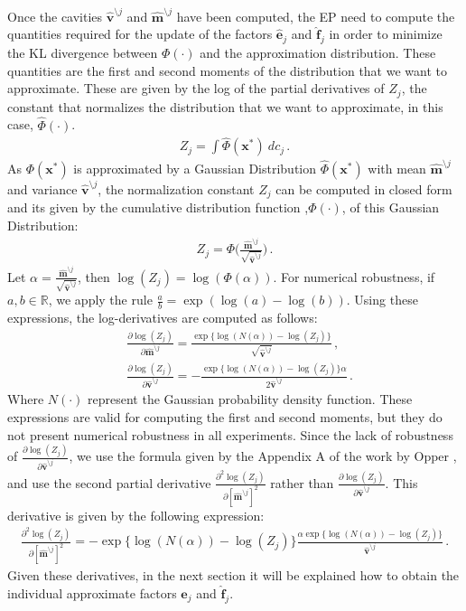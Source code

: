 \documentclass[review,preprint,12pt]{elsarticle}
\begin{document}
Once the cavities $\boldsymbol{\hat{v}}^{\setminus j}$ and $\boldsymbol{\hat{m}}^{\setminus j}$ have been computed, the EP need to compute the quantities required for the update of the factors $\boldsymbol{\hat{e}}_{j}$ and $\boldsymbol{\hat{f}}_{j}$ in order to minimize the KL divergence between $\Phi(\cdot)$ and the approximation distribution. These quantities are the first and second moments of the distribution that we want to approximate. These are given by the log of the partial derivatives of $Z_j$, the constant that normalizes the distribution that we want to approximate, in this case, $\hat{\Phi}(\cdot)$.
\begin{align}
Z_j = \int \hat{\Phi}(\boldsymbol{x}^*)\ dc_j\,.
\end{align}
As $\Phi(\boldsymbol{x}^*)$ is approximated by a Gaussian Distribution $\hat{\Phi}(\boldsymbol{x}^*)$ with mean $\boldsymbol{\hat{m}}^{\setminus j}$ and variance $\boldsymbol{\hat{v}}^{\setminus j}$, the normalization constant $Z_j$ can be computed in closed form and its given by the cumulative distribution function ,$\Phi(\cdot)$, of this Gaussian Distribution:
\begin{align}
Z_j = \Phi\Bigg(\frac{\boldsymbol{\hat{m}}^{\setminus j}}{\sqrt{\boldsymbol{\hat{v}}^{\setminus j}}}\Bigg)\,.
\end{align}
Let $\alpha =  \frac{\boldsymbol{\hat{m}}^{\setminus j}}{\sqrt{\boldsymbol{\hat{v}}^{\setminus j}}}$, then $\log(Z_j) = \log(\Phi(\alpha))$. For numerical robustness, if $a,b \in \mathbb{R}$, we apply the rule $ \frac{a}{b} = \exp{(\log(a)-\log(b))}$. Using these expressions, the log-derivatives are computed as follows:
\begin{align}
& \frac{\partial \log(Z_j)}{\partial \boldsymbol{\hat{m}}^{\setminus j}} = \frac{\exp\{\log(N(\alpha))-\log(Z_j)\}}{\sqrt{\boldsymbol{\hat{v}}^{\setminus j}}}\,, \nonumber \\
& \frac{\partial \log(Z_j)}{\partial \boldsymbol{\hat{v}}^{\setminus j}} = - \frac{\exp\{\log(N(\alpha))-\log(Z_j)\}\alpha}{2\boldsymbol{\hat{v}}^{\setminus j}}\,.
\end{align}
Where $N(\cdot)$ represent the Gaussian probability density function. These expressions are valid for computing the first and second moments, but they do not present numerical robustness in all experiments. Since the lack of robustness of $\frac{\partial \log(Z_j)}{\partial \boldsymbol{\hat{v}}^{\setminus j}}$, we use the formula given by the Appendix A of the work by Opper \citep{opper2009variational}, and use the second partial derivative $\frac{\partial^{2} \log(Z_j)}{\partial [\boldsymbol{\hat{m}}^{\setminus j}]^2}$ rather than $\frac{\partial \log(Z_j)}{\partial \boldsymbol{\hat{v}}^{\setminus j}}$. This derivative is given by the following expression:
\begin{align}
\frac{\partial^{2} \log(Z_j)}{\partial [\boldsymbol{\hat{m}}^{\setminus j}]^2} = - \exp\{\log(N(\alpha))-\log(Z_j)\}\frac{\alpha\exp\{\log(N(\alpha))-\log(Z_j)\}}{\boldsymbol{\hat{v}}^{\setminus j}}\,.
\end{align}
Given these derivatives, in the next section it will be explained how to obtain the individual approximate factors $\boldsymbol{\hat{e}}_{j}$ and $\boldsymbol{\hat{f}}_{j}$.
\end{document}
